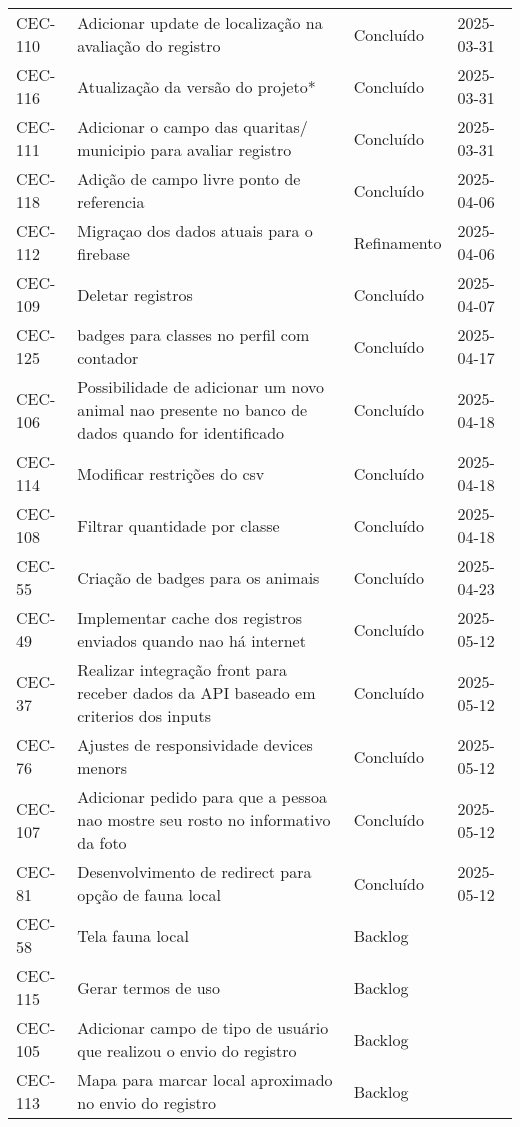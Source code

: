 \begin{longtable}{@{}lp{7cm}ll@{}}
CEC-110 & Adicionar update de localização na avaliação do registro & Concluído & 2025-03-31 \\
CEC-116 & Atualização da versão do projeto* & Concluído & 2025-03-31 \\
CEC-111 & Adicionar o campo das quaritas/ municipio para avaliar registro & Concluído & 2025-03-31 \\
CEC-118 & Adição de campo livre ponto de referencia & Concluído & 2025-04-06 \\
CEC-112 & Migraçao dos dados atuais para o firebase & Refinamento & 2025-04-06 \\
CEC-109 & Deletar registros & Concluído & 2025-04-07 \\
CEC-125 & badges para classes no perfil com contador & Concluído & 2025-04-17 \\
CEC-106 & Possibilidade de adicionar um novo animal nao presente no banco de dados quando for identificado & Concluído & 2025-04-18 \\
CEC-114 & Modificar restrições do csv & Concluído & 2025-04-18 \\
CEC-108 & Filtrar quantidade por classe & Concluído & 2025-04-18 \\
CEC-55 & Criação de badges para os animais & Concluído & 2025-04-23 \\
CEC-49 & Implementar cache dos registros enviados quando nao há internet & Concluído & 2025-05-12 \\
CEC-37 & Realizar integração front para receber dados da API baseado em criterios dos inputs & Concluído & 2025-05-12 \\
CEC-76 & Ajustes de responsividade devices menors & Concluído & 2025-05-12 \\
CEC-107 & Adicionar pedido para que a pessoa nao mostre seu rosto no informativo da foto & Concluído & 2025-05-12 \\
CEC-81 & Desenvolvimento de redirect para opção de fauna local & Concluído & 2025-05-12 \\
CEC-58 & Tela fauna local & Backlog & \\
CEC-115 & Gerar termos de uso & Backlog & \\
CEC-105 & Adicionar campo de tipo de usuário que realizou o envio do registro & Backlog & \\
CEC-113 & Mapa para marcar local aproximado no envio do registro & Backlog & \\

\end{longtable}